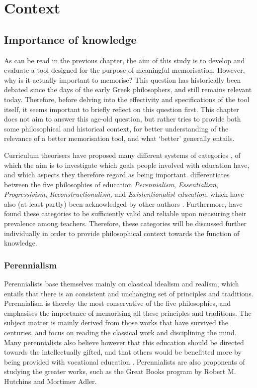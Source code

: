 \chapter{Context}

\section{Importance of knowledge}

As can be read in the previous chapter, the aim of this study is to develop and evaluate a tool designed for the purpose of meaningful memorisation. However, why is it actually important to memorise? This question has historically been debated since the days of the early Greek philosophers, and still remains relevant today. Therefore, before delving into the effectivity and specifications of the tool itself, it seems important to briefly reflect on this question first. This chapter does not aim to answer this age-old question, but rather tries to provide both some philosophical and historical context, for better understanding of the relevance of a better memorisation tool, and what `better' generally entails.

Curriculum theorisers have proposed many different systems of categories \cite{curriculumtheory}, of which the aim is to investigate which goals people involved with education have, and which aspects they therefore regard as being important.  differentiates between the five philosophies of education \emph{Perennialism}, \emph{Essentialism}, \emph{Progressivism}, \emph{Reconstructionalism}, and \emph{Existentionalist education}, which have also (at least partly) been acknowledged by other authors \cite{educationalphilosophy, educationalphilosophy2, educationalphilosophy3, educationalphilosophy4}. Furthermore,  have found these categories to be sufficiently valid and reliable upon measuring their prevalence among teachers. Therefore, these categories will be discussed further individually in order to provide philosophical context towards the function of knowledge.

\subsection{Perennialism}

Perennialists base themselves mainly on classical idealism and realism, which entails that there is an consistent and unchanging set of principles and traditions. Perennialism is thereby the most conservative of the five philosophies, and emphasises the importance of memorising all these principles and traditions. The subject matter is mainly derived from those works that have survived the centuries, and focus on reading the classical work and disciplining the mind. Many perennialists also believe however that this education should be directed towards the intellectually gifted, and that others would be benefitted more by being provided with vocational education \cite{educationalphilosophy5}. Perennialists are also proponents of studying the greater works, such as the Great Books program by Robert M. Hutchins and Mortimer Adler.

